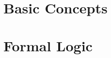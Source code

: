 \documentclass[openany, twoside]{book}
\begin{document}
\raggedright
\setlength{\parindent}{1em}
\setlength{\parskip}{1em}	

\frontmatter
\pagestyle{plain} %

	


{
\setlength{\parskip}{0em}

\renewcommand{\cftpartpresnum}{\sf\Large\partname\ }
\tableofcontents
}






\mainmatter
\setlength{\parindent}{1em}
\pagestyle{headings} %

\part{Basic Concepts} \label{part:basic_concepts}
	


\part{Formal Logic} \label{part:formal_logic}

%
%
	





\end{document}
